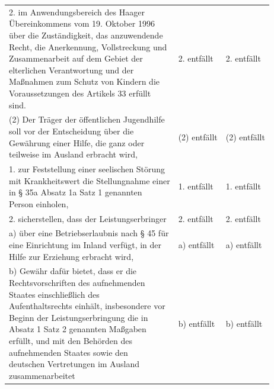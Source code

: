 \documentclass[10pt,a4paper,landscape]{article}
\begin{document}
\begin{longtable}{|L{8.2cm}|L{8.2cm}|L{8.2cm}|}
\hhline{|---|}
2.   \newline \textcolor{diffred}{im Anwendungsbereich des Haager  \newline Übereinkommens vom 19. Oktober 1996  \newline über die Zuständigkeit, das anzuwendende  \newline Recht, die Anerkennung, Vollstreckung und  \newline Zusammenarbeit auf dem Gebiet der  \newline elterlichen Verantwortung und der  \newline Maßnahmen zum Schutz von Kindern die  \newline Voraussetzungen des Artikels 33 erfüllt  \newline sind.} & 2. entfällt & 2. entfällt \\
\hhline{|---|}
(2) \textcolor{diffred}{Der Träger der öffentlichen Jugendhilfe  \newline soll vor der Entscheidung über die  \newline Gewährung einer Hilfe, die ganz oder  \newline teilweise im Ausland erbracht wird,} & (2) entfällt & (2) entfällt \\
\hhline{|---|}
1.   \newline \textcolor{diffred}{zur Feststellung einer seelischen Störung  \newline mit Krankheitswert die Stellungnahme einer  \newline in \S{} 35a Absatz 1a Satz 1 genannten  \newline Person einholen,} & 1. entfällt & 1. entfällt \\
\hhline{|---|}
2.   \newline \textcolor{diffred}{sicherstellen, dass der Leistungserbringer} & 2. entfällt & 2. entfällt \\
\hhline{|---|}
a)   \newline \textcolor{diffred}{über eine Betriebserlaubnis nach \S{} 45 für  \newline eine Einrichtung im Inland verfügt, in der  \newline Hilfe zur Erziehung erbracht wird,} & a) entfällt & a) entfällt \\
\hhline{|---|}
b)   \newline \textcolor{diffred}{Gewähr dafür bietet, dass er die  \newline Rechtsvorschriften des aufnehmenden  \newline Staates einschließlich des  \newline Aufenthaltsrechts einhält, insbesondere vor  \newline Beginn der Leistungserbringung die in  \newline Absatz 1 Satz 2 genannten Maßgaben  \newline erfüllt, und mit den Behörden des  \newline aufnehmenden Staates sowie den  \newline deutschen Vertretungen im Ausland  \newline zusammenarbeitet} & b) entfällt & b) entfällt \\

\end{longtable}
\end{document}

